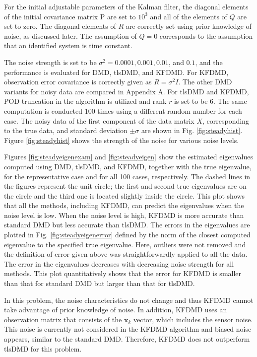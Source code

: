 \documentclass[aip,graphicx]{revtex4-1}
\begin{document}
For the initial adjustable parameters of the Kalman filter, the diagonal elements of the initial covariance matrix P are set to $10^3$ and all of the elements of $Q$ are set to zero. The diagonal elements of $R$ are correctly set using prior knowledge of noise, as discussed later. The assumption of $Q=0$ corresponds to the assumption that an identified system is time constant. 

The noise strength is set to be $\sigma^2=0.0001, 0.001, 0.01$, and $0.1$, and the performance is evaluated for DMD, tlsDMD, and KFDMD. For KFDMD, observation error covariance is correctly given as $R=\sigma^2 I$. The other DMD variants for noisy data are compared in Appendix A. For tlsDMD and KFDMD, POD truncation in the algorithm is utilized and rank $r$ is set to be 6. The same computation is conducted 100 times using a different random number for each case. The noisy data of the first component of the data matrix $X$, corresponding to the true data, and standard deviation $\pm \sigma$ are shown in Fig. \ref{fig:steadyhist}.  Figure \ref{fig:steadyhist} shows the strength of the noise for various noise levels.  

Figures \ref{fig:steadyeigenexam} and \ref{fig:steadyeigen} show the estimated eigenvalues computed using DMD, tlsDMD, and KFDMD, together with the true eigenvalue, for the representative case and for all 100 cases, respectively. The dashed lines in the figures represent the unit circle; the first and second true eigenvalues are on the circle and the third one is located slightly inside the circle. This plot shows that all the methods, including KFDMD, can predict the eigenvalues when the noise level is low. When the noise level is high, KFDMD is more accurate than standard DMD but less accurate than tlsDMD. The errors in the eigenvalues are plotted in Fig. \ref{fig:steadyeigenerror} defined by the norm of the closest computed eigenvalue to the specified true eigenvalue. Here, outliers were not removed and the definition of error given above was straightforwardly applied to all the data.  The error in the eigenvalues decreases with decreasing noise strength for all methods. This plot quantitatively shows that the error for KFDMD is smaller than that for standard DMD but larger than that for tlsDMD. 

In this problem, the noise characteristics do not change and thus KFDMD cannot take advantage of prior knowledge of noise. In addition, KFDMD uses an observation matrix that consists of the $\bm{x}_k$ vector, which includes the sensor noise. This noise is currently not considered in the KFDMD algorithm and biased noise appears, similar to the standard DMD. Therefore, KFDMD does not outperform tlsDMD for this problem.
\end{document}
